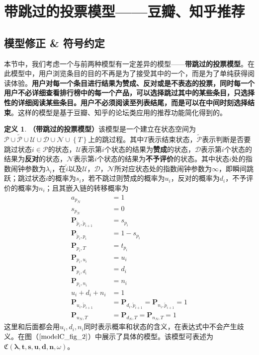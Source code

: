 \documentclass[UTF8]{ctexart}
\theoremstyle{plain}
\theoremstyle{definition}
\newtheorem{defn}{定义}[section]
\theoremstyle{remark}
\begin{document}
	\section{带跳过的投票模型——豆瓣、知乎推荐}
	\subsection{模型修正 \& 符号约定}
    本节中，我们考虑一个与前两种模型有一定差异的模型——\textbf{带跳过的投票模型}。在此模型中，用户浏览条目的目的不再是为了接受其中的一个，而是为了单纯获得阅读体验。\textbf{用户对每一个条目进行结果为赞成、反对或是不表态的投票，同时每一个用户不必详细查看排行榜中的每一个产品，可以选择跳过其中的某些条目，只选择性的详细阅读某些条目。用户不必须阅读至列表结尾，而是可以在中间时刻选择结束}。这样的模型是基于豆瓣、知乎的论坛类应用的推荐功能简化得到的。
	\begin{defn}\textbf{（带跳过的投票模型）}该模型是一个建立在状态空间为$\mathcal{P} \cup \mathcal{\tilde{P}} \cup \mathcal{U} \cup \mathcal{D} \cup \mathcal{N} \cup \left\{T\right\}$上的跳过程。其中$T$表示结束状态，$\mathcal{\tilde{P}}$表示判断是否要跳过状态$i \in \mathcal{P}$的状态，$\mathcal{U}$表示第$i$个状态的结果为\textbf{赞成}的状态，$\mathcal{D}$表示第$i$个状态的结果为\textbf{反对}的状态，$\mathcal{N}$表示第$i$个状态的结果为\textbf{不予评价}的状态。其中状态$i$处的指数闹钟参数为$\lambda_i$，在$\tilde{i}$以及$\mathcal{U}$，$\mathcal{D}$，$\mathcal{N}$所对应状态处的指数闹钟参数为$\infty$，即瞬间跳跃；跳过状态$i$的概率为$s_i$，若不跳过则赞成的概率为$u_i$，反对的概率为$d_i$，不予评价的概率为$n_i$；且其嵌入链的转移概率为
	\begin{equation}
	\begin{aligned}
	a_{p_N} & = 1 \\
	s_{p_N} & = 0 \\
	\bm{P}_{\tilde{p}_i, \tilde{p}_{i+1}} & = s_{p_i} \\
	\bm{P}_{\tilde{p}_i, p_i} & = 1 - s_{p_i} \\
	\bm{P}_{p_i,T}  & = t_{p_i} \\
	\bm{P}_{p_i,u_i} & = u_i \\
	\bm{P}_{p_i,d_i} & = d_i \\
	\bm{P}_{p_i,n_i} & = n_i \\
	u_i + d_i + n_i & = 1\\
	\bm{P}_{u_i, \tilde{p}_{i+1}} & = \bm{P}_{d_i, \tilde{p}_{i+1}} = \bm{P}_{n_i, \tilde{p}_{i+1}} = 1 \\
	\bm{P}_{u_N, T} & = \bm{P}_{d_N, T} = \bm{P}_{n_N, T} = 1
	\end{aligned}
	\end{equation}
	这里和后面都会用$u_i,d_i,n_i$同时表示概率和状态的含义，在表达式中不会产生歧义。在图（$\ref{modelC_fig_2}$）中展示了具体的模型。该模型可表述为$\mathfrak{C}\left(\bm{\lambda}, \bm{t}, \bm{s}, \bm{u}, \bm{d}, \bm{n},\omega\right)$。
	\end{defn}
\end{document}
